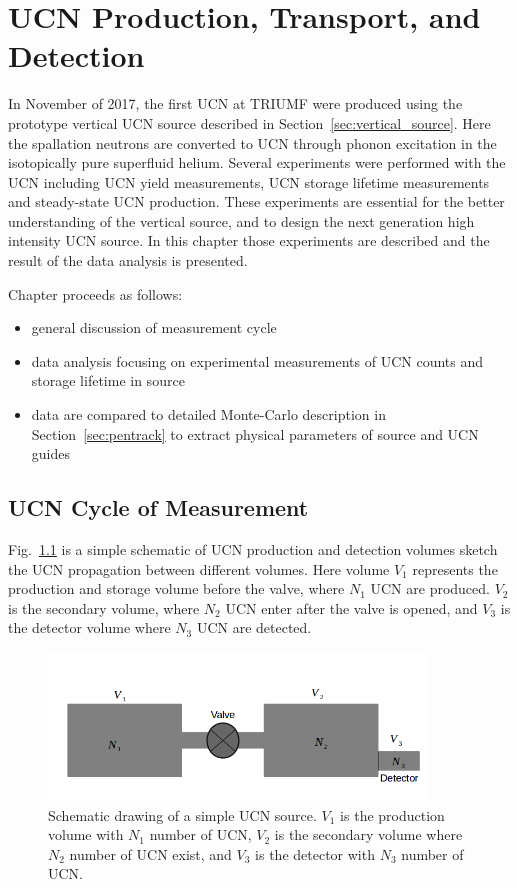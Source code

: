 \chapter{UCN Production, Transport, and
  Detection\label{chap:UCNresult}}

In November of 2017, the first UCN at TRIUMF were produced using the
prototype vertical UCN source described in
Section~\ref{sec:vertical_source}. Here the spallation neutrons are
converted to UCN through phonon excitation in the isotopically pure
superfluid helium. Several experiments were performed with the UCN
including UCN yield measurements, UCN storage lifetime measurements
and steady-state UCN production. These experiments are essential for
the better understanding of the vertical source, and to design the next
generation high intensity UCN source. In this chapter those
experiments are described and the result of the data analysis is
presented.

Chapter proceeds as follows:
\begin{itemize}
\item general discussion of measurement cycle
\item data analysis focusing on experimental measurements of UCN
  counts and storage lifetime in source
\item data are compared to detailed Monte-Carlo description in
  Section~\ref{sec:pentrack} to extract physical parameters of source
  and UCN guides
\end{itemize}

\section{UCN Cycle of Measurement}
Fig.~\ref{fig:volume_schematic} is a simple schematic of UCN
production and detection volumes sketch the UCN propagation between
different volumes. Here volume $V_1$ represents the production and
storage volume before the valve, where $N_1$ UCN are produced. $V_2$
is the secondary volume, where $N_2$ UCN enter after the valve is
opened, and $V_3$ is the detector volume where $N_3$ UCN are detected.


\begin{figure}[h]
  \centering
  \includegraphics[width=0.9\textwidth]{volume_schematic.png}
  \caption[Schematic drawing of a simple UCN source]{Schematic drawing
    of a simple UCN source. $V_1$ is the production volume with $N_1$
    number of UCN, $V_2$ is the secondary volume where $N_2$ number of
    UCN exist, and $V_3$ is the detector with $N_3$ number of UCN. }
  \label{fig:volume_schematic}
\end{figure}

